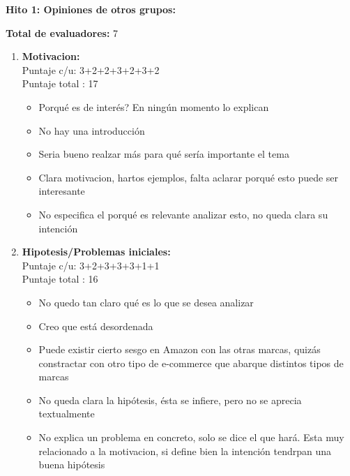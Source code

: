 \documentclass[letterpaper,10.7pt]{article}
\begin{document}
\begin{center}
\textbf{{\large Hito 1: Opiniones de otros grupos:}}
\end{center}

\textbf{Total de evaluadores:} 7

\begin{enumerate}
\item \textbf{Motivacion:}\\
Puntaje c/u:  3+2+2+3+2+3+2\\
Puntaje total : 17
\begin{itemize}
	\item Porqué es de interés? En ningún momento lo explican
	\item No hay una introducción
	\item Seria bueno realzar más para qué sería importante el tema
	\item Clara motivacion, hartos ejemplos, falta aclarar porqué esto puede ser interesante
	\item No especifica el porqué es relevante analizar esto, no queda clara su intención
\end{itemize}


\item \textbf{Hipotesis/Problemas iniciales:}\\
Puntaje c/u: 3+2+3+3+3+1+1\\
Puntaje total : 16
\begin{itemize}
	\item No quedo tan claro qué es lo que se desea analizar
	\item Creo que está desordenada
	\item Puede existir cierto sesgo en Amazon con las otras marcas, quizás constractar con otro tipo de e-commerce que abarque distintos tipos de marcas
	\item No queda clara la hipótesis, ésta se infiere, pero no se aprecia textualmente
	\item No explica un problema en concreto, solo se dice el que hará. Esta muy relacionado a la motivacion, si define bien la intención tendrpan una buena hipótesis
\end{itemize}



\end{enumerate}
\end{document}
